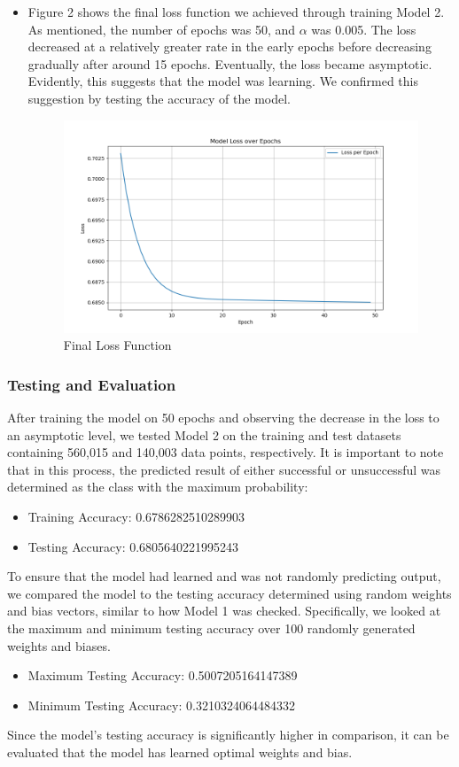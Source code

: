 \documentclass[11pt]{article}
\begin{document}
\begin{itemize}
    \item Figure 2 shows the final loss function we achieved through training Model 2. As mentioned, the number of epochs was 50, and $\alpha$ was 0.005. The loss decreased at a relatively greater rate in the early epochs before decreasing gradually after around 15 epochs. Eventually, the loss became asymptotic. Evidently, this suggests that the model was learning. We confirmed this suggestion by testing the accuracy of the model. 
         \begin{figure}[H]
        \centering
        \includegraphics[width=0.8\linewidth]{loss_m2final.png}
        \caption{Final Loss Function}
        \end{figure}
\end{itemize}
\subsubsection{Testing and Evaluation}
After training the model on 50 epochs and observing the decrease in the loss to an asymptotic level, we tested Model 2 on the training and test datasets containing 560,015 and 140,003 data points, respectively. It is important to note that in this process, the predicted result of either successful or unsuccessful was determined as the class with the maximum probability:
\begin{itemize}
    \item Training Accuracy: 0.6786282510289903
    \item Testing Accuracy: 0.6805640221995243
\end{itemize}

To ensure that the model had learned and was not randomly predicting output, we compared the model to the testing accuracy determined using random weights and bias vectors, similar to how Model 1 was checked. Specifically, we looked at the maximum and minimum testing accuracy over 100 randomly generated weights and biases.  
\begin{itemize}
    \item Maximum Testing Accuracy: 0.5007205164147389
    \item Minimum Testing Accuracy: 0.3210324064484332
\end{itemize}
Since the model's testing accuracy is significantly higher in comparison, it can be evaluated that the model has learned optimal weights and bias. 
\end{document}
